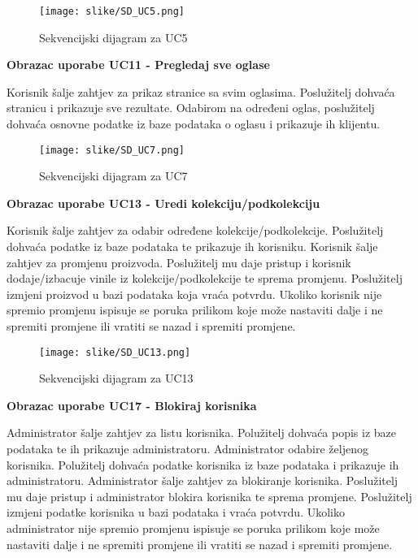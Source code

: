 				\begin{figure}[H]
					\texttt{[image: slike/SD\_UC5.png]}
					\centering
					\caption{Sekvencijski dijagram za UC5}
					\label{fig:UC5}
				\end{figure}
				
				
				\eject
				
			\textbf{Obrazac uporabe UC11 - Pregledaj sve oglase}
				
				\text Korisnik šalje zahtjev za prikaz stranice sa svim oglasima. Poslužitelj dohvaća stranicu i prikazuje sve rezultate. Odabirom na određeni oglas, poslužitelj dohvaća osnovne podatke iz baze podataka o oglasu i prikazuje ih klijentu.
				
				\begin{figure}[H]
					\texttt{[image: slike/SD\_UC7.png]}
					\centering
					\caption{Sekvencijski dijagram za UC7}
					\label{fig:UC7}
				\end{figure}
				
				\eject
				
			\textbf{Obrazac uporabe UC13 - Uredi kolekciju/podkolekciju}
				
				\text Korisnik šalje zahtjev za odabir određene kolekcije/podkolekcije. Poslužitelj dohvaća podatke iz baze podataka te prikazuje ih korisniku. Korisnik šalje zahtjev za promjenu proizvoda. Poslužitelj mu daje pristup i korisnik dodaje/izbacuje vinile iz kolekcije/podkolekcije te sprema promjenu. Poslužitelj izmjeni proizvod u bazi podataka koja vraća potvrdu.  Ukoliko korisnik nije spremio promjenu ispisuje se poruka prilikom koje može nastaviti dalje i ne spremiti promjene ili vratiti se nazad i spremiti promjene.
				
				\begin{figure}[H]
					\texttt{[image: slike/SD\_UC13.png]}
					\centering
					\caption{Sekvencijski dijagram za UC13}
					\label{fig:UC13}
				\end{figure}
				
				\eject
				
			\textbf{Obrazac uporabe UC17 - Blokiraj korisnika}
				
				\text 	Administrator šalje zahtjev za listu korisnika. Polužitelj dohvaća popis iz baze podataka te ih prikazuje administratoru. Administrator odabire željenog korisnika. Polužitelj dohvaća podatke korisnika iz baze podataka i prikazuje ih administratoru. Administrator šalje zahtjev za blokiranje korisnika. Poslužitelj mu daje pristup i administrator blokira korisnika te sprema promjene. Poslužitelj izmjeni podatke korisnika u bazi podataka i vraća potvrdu. Ukoliko administrator nije spremio promjenu ispisuje se poruka prilikom koje može nastaviti dalje i ne spremiti promjene ili vratiti se nazad i spremiti promjene.
				
